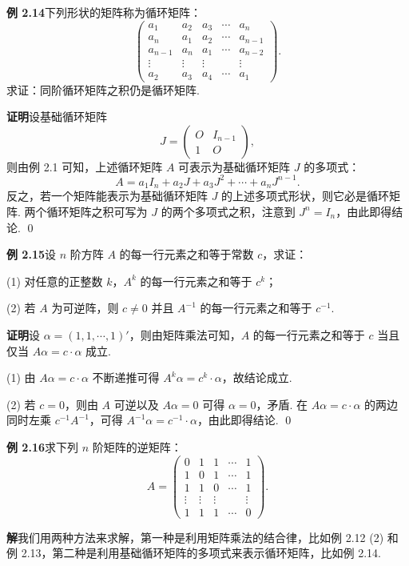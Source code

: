 \documentclass[UTF8,12pt,a4paper,fontset=fandol]{ctexart}
\begin{document}
\noindent\textbf{例 2.14}\quad 下列形状的矩阵称为循环矩阵：
\[
\left(
\begin{array}{ccccc}
a_1 & a_2 & a_3 & \cdots & a_n\\
a_n & a_1 & a_2 & \cdots & a_{n-1}\\
a_{n-1} & a_n & a_1 & \cdots & a_{n-2}\\
\vdots & \vdots & \vdots & & \vdots\\
a_2 & a_3 & a_4 & \cdots & a_1
\end{array}
\right).
\]
求证：同阶循环矩阵之积仍是循环矩阵.

\noindent\textbf{证明}\quad 设基础循环矩阵
\[
J=
\left(
\begin{array}{cc}
O & I_{n-1}\\
1 & O
\end{array}
\right),
\]
则由例 2.1 可知，上述循环矩阵 $A$ 可表示为基础循环矩阵 $J$ 的多项式：
\[
A=a_1I_n+a_2J+a_3J^2+\cdots+a_nJ^{n-1}.
\]
反之，若一个矩阵能表示为基础循环矩阵 $J$ 的上述多项式形状，则它必是循环矩阵. 两个循环矩阵之积可写为 $J$ 的两个多项式之积，注意到 $J^n=I_n$，由此即得结论. \qed

\noindent\textbf{例 2.15}\quad 设 $n$ 阶方阵 $A$ 的每一行元素之和等于常数 $c$，求证：

(1) 对任意的正整数 $k$，$A^k$ 的每一行元素之和等于 $c^k$；

(2) 若 $A$ 为可逆阵，则 $c\ne0$ 并且 $A^{-1}$ 的每一行元素之和等于 $c^{-1}$.

\noindent\textbf{证明}\quad 设 $\alpha=(1,1,\cdots,1)'$，则由矩阵乘法可知，$A$ 的每一行元素之和等于 $c$ 当且仅当 $A\alpha=c\cdot\alpha$ 成立.

(1) 由 $A\alpha=c\cdot\alpha$ 不断递推可得 $A^k\alpha=c^k\cdot\alpha$，故结论成立.

(2) 若 $c=0$，则由 $A$ 可逆以及 $A\alpha=0$ 可得 $\alpha=0$，矛盾. 在 $A\alpha=c\cdot\alpha$ 的两边同时左乘 $c^{-1}A^{-1}$，可得 $A^{-1}\alpha=c^{-1}\cdot\alpha$，由此即得结论. \qed

\noindent\textbf{例 2.16}\quad 求下列 $n$ 阶矩阵的逆矩阵：
\[
A=
\left(
\begin{array}{ccccc}
0 & 1 & 1 & \cdots & 1\\
1 & 0 & 1 & \cdots & 1\\
1 & 1 & 0 & \cdots & 1\\
\vdots & \vdots & \vdots & & \vdots\\
1 & 1 & 1 & \cdots & 0
\end{array}
\right).
\]

\noindent\textbf{解}\quad 我们用两种方法来求解，第一种是利用矩阵乘法的结合律，比如例 2.12 (2) 和例 2.13，第二种是利用基础循环矩阵的多项式来表示循环矩阵，比如例 2.14.
\end{document}
